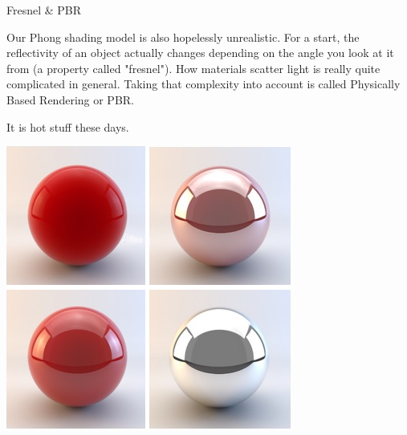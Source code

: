 \documentclass{lug}
\newcommand{\splitslide}[4]{
    \noindent
    \begin{minipage}{#1 \textwidth - #2 }
        #3
    \end{minipage}%
    \hspace{ \dimexpr #2 * 2 \relax }%
    \begin{minipage}{\textwidth - #1 \textwidth - #2 }
        #4
    \end{minipage}
}
\begin{document}
\begin{frame}{Fresnel \& PBR}
    \splitslide{0.65}{.7em}{
        \small

        Our Phong shading model is also hopelessly unrealistic. For a start,
        the reflectivity of an object actually changes depending on the angle
        you look at it from (a property called "fresnel"). How materials
        scatter light is really quite complicated in general. Taking that
        complexity into account is called Physically Based Rendering or PBR.

        \vspace{1ex}

        It is hot stuff these days.

    }{
        \includegraphics[width=\textwidth]{graphics/fresnel_spheres}
    }
\end{frame}
\end{document}
